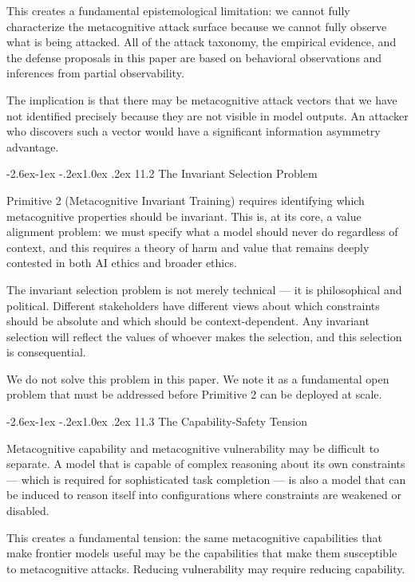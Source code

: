 \documentclass[
  11pt,
]{article}
\makeatletter
\renewcommand\subsection{\@startsection{subsection}{2}{\z@}%
  {-2.6ex\@plus -1ex \@minus -.2ex}{1.0ex \@plus .2ex}%
  {\normalfont\sffamily\large\bfseries}}
\makeatother
\begin{document}
This creates a fundamental epistemological limitation: we cannot fully
characterize the metacognitive attack surface because we cannot fully
observe what is being attacked. All of the attack taxonomy, the
empirical evidence, and the defense proposals in this paper are based on
behavioral observations and inferences from partial observability.

The implication is that there may be metacognitive attack vectors that
we have not identified precisely because they are not visible in model
outputs. An attacker who discovers such a vector would have a
significant information asymmetry advantage.

\subsection{11.2 The Invariant Selection
Problem}\label{the-invariant-selection-problem}

Primitive 2 (Metacognitive Invariant Training) requires identifying
which metacognitive properties should be invariant. This is, at its
core, a value alignment problem: we must specify what a model should
never do regardless of context, and this requires a theory of harm and
value that remains deeply contested in both AI ethics and broader
ethics.

The invariant selection problem is not merely technical --- it is
philosophical and political. Different stakeholders have different views
about which constraints should be absolute and which should be
context-dependent. Any invariant selection will reflect the values of
whoever makes the selection, and this selection is consequential.

We do not solve this problem in this paper. We note it as a fundamental
open problem that must be addressed before Primitive 2 can be deployed
at scale.

\subsection{11.3 The Capability-Safety
Tension}\label{the-capability-safety-tension}

Metacognitive capability and metacognitive vulnerability may be
difficult to separate. A model that is capable of complex reasoning
about its own constraints --- which is required for sophisticated task
completion --- is also a model that can be induced to reason itself into
configurations where constraints are weakened or disabled.

This creates a fundamental tension: the same metacognitive capabilities
that make frontier models useful may be the capabilities that make them
susceptible to metacognitive attacks. Reducing vulnerability may require
reducing capability.
\end{document}
